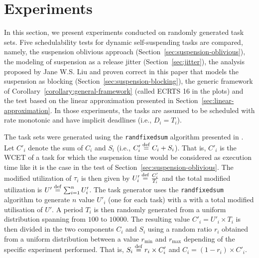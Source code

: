 \section{Experiments}
\label{sec:experiments}

In this section, we present experiments conducted on randomly generated task sets. Five schedulability tests for dynamic self-suspending tasks are compared, namely, the suspension oblivious approach (Section~\ref{sec:suspension-oblivious}), the modeling of suspension as a release jitter (Section~\ref{sec:jitter}), the analysis proposed by Jane W.S. Liu and proven correct in this paper that models the suspension as blocking (Section~\ref{sec:suspension-blocking}), the generic framework of Corollary~\ref{corollary:general-framework} (called ECRTS 16 in the plots) and the test based on the linear approximation presented in Section~\ref{sec:linear-approximation}. In those experiments, the tasks are assumed to be scheduled with rate monotonic and have implicit deadlines (i.e., $D_i = T_i$).

The task sets were generated using the \texttt{randfixedsum} algorithm presented in \cite{Emberson-taskSetGeneration-2010}. Let $C'_i$ denote the sum of $C_i$ and $S_i$ (i.e., $C'_i \stackrel{\mathrm{def}}{=} C_i + S_i$). That is, $C'_i$ is the WCET of a task for which the suspension time would be considered as execution time like it is the case in the test of Section~\ref{sec:suspension-oblivious}. The modified utilization of $\tau_i$ is then given by $U'_i \stackrel{\mathrm{def}}{=} \frac{C'_i}{T_i}$ and the total modified utilization is $U' \stackrel{\mathrm{def}}{=} \sum_{i=1}^n U'_i$. The task generator uses the \texttt{randfixedsum} algorithm to generate $n$ value $U'_i$ (one for each task) with a with a total modified utilisation of $U'$. A period $T_i$ is then randomly generated from a uniform distribution spanning from $100$ to $10000$. The resulting value $C'_i = U'_i \times T_i$ is then divided in the two components $C_i$ and $S_i$ using a random ratio $r_i$ obtained from a uniform distribution between a value $r_{\min}$ and $r_{\max}$ depending of the specific experiment performed. That is, $S_i \stackrel{\mathrm{def}}{=} r_i \times C'_i$ and $C_i = (1 - r_i) \times C'_i$. 

